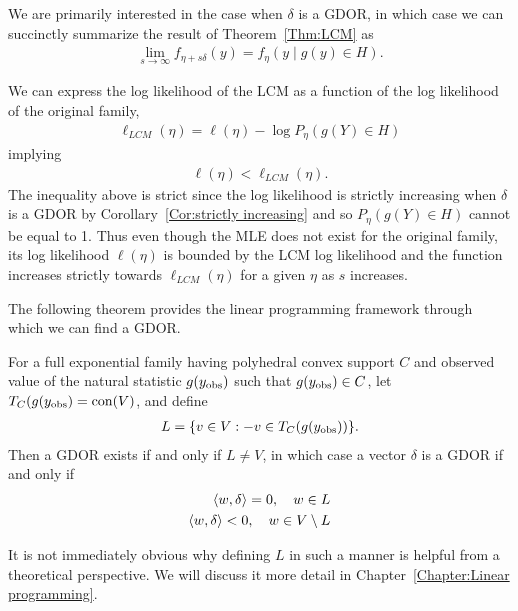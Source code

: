 We are primarily interested in the case when $\delta$ is a GDOR, in which case
we can succinctly summarize the result of Theorem~\ref{Thm:LCM} as
\begin{align*}
\lim_{s \to \infty} f_{\eta+s\delta}(y) = f_{\eta}( y \mid g(y) \in H).
\end{align*}

We can express the log likelihood of the LCM as a function of the 
log likelihood of the original family,
\begin{align} \label{E:LCM ll bound}
 \ell_{LCM}(\eta) = \ell(\eta) - \log P_\eta(g(Y) \in H)
\end{align}
implying
\begin{align*}
	\ell(\eta) < \ell_{LCM}(\eta).	
\end{align*}
The inequality above is strict since the log likelihood is strictly increasing
when $\delta$ is a GDOR by Corollary~\ref{Cor:strictly increasing}
and so $P_\eta(g(Y) \in H)$ cannot be equal to 1.
Thus even though the MLE does not exist for the original family, its log likelihood
$\ell(\eta)$ is bounded by the LCM log likelihood and the function increases strictly
towards $\ell_{LCM}(\eta)$ for a given $\eta$ as $s$ increases.






The following theorem provides the linear programming framework through
which we can find a GDOR.  
\begin{theorem} \label{Thm:L-GDOR}
For a full exponential family having polyhedral convex support $C$ and observed value 
of the natural statistic $g(y_{\textrm{obs}})$ such that $g(y_{\textrm{obs}}) \in C$, 
let $T_C(g(y_{\textrm{obs}}) = \operatorname{con}(V)$, and define
\begin{align*}
	L = \{ v \in V: -v \in T_C(g(y_{\textrm{obs}})) \}.
\end{align*}
Then a GDOR exists if and only if $L \neq V$, in which case a vector $\delta$ is a GDOR if and 
only if
\begin{align*}
	\langle w, \delta \rangle = 0, \quad w \in L \\
	\langle w, \delta \rangle < 0, \quad w \in V \setminus L \\
\end{align*}
\end{theorem}
It is not immediately obvious why defining $L$ in such a manner is helpful from a theoretical 
perspective.  
We will discuss it more detail in Chapter~\ref{Chapter:Linear programming}.


